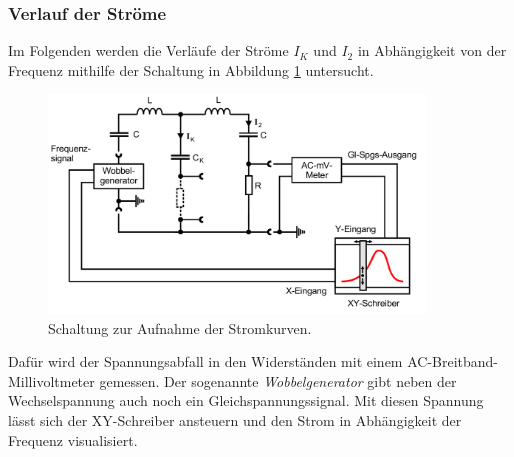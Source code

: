 \subsubsection*{Verlauf der Ströme}

Im Folgenden werden die Verläufe der Ströme $I_{K}$ und $I_{2}$ in Abhängigkeit von der Frequenz
mithilfe der Schaltung in Abbildung \ref{fig:stromkurven} untersucht.

\begin{figure} 
    \centering
    \includegraphics[width=10cm] {pictures/stromkurven.png} 
    \caption{Schaltung zur Aufnahme der Stromkurven. \cite{v355}}
    \label{fig:stromkurven}
\end{figure} 

Dafür wird der Spannungsabfall in den Widerständen mit einem AC-Breitband-Millivoltmeter gemessen.
Der sogenannte \textit{Wobbelgenerator} gibt neben der Wechselspannung auch noch ein Gleichspannungssignal.
Mit diesen Spannung lässt sich der XY-Schreiber ansteuern und  den Strom in Abhängigkeit der Frequenz visualisiert.
